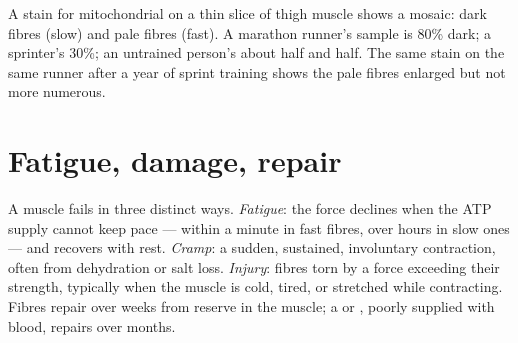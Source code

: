 \begin{example}\label{ex:g10:muscles-and-joints:biopsy}
A stain for mitochondrial  on a thin slice of thigh muscle
shows a mosaic: dark fibres (slow) and pale fibres (fast). A marathon
runner's sample is 80\% dark; a sprinter's 30\%; an untrained person's
about half and half. The same stain on the same runner after a year of
sprint training shows the pale fibres enlarged but not more numerous.
\end{example}

\section{Fatigue, damage, repair}

\begin{proposition}\label{prop:g10:muscles-and-joints:limits}
A muscle fails in three distinct ways. \emph{Fatigue}: the force
declines when the ATP supply cannot keep pace --- within a minute in
fast fibres, over hours in slow ones --- and recovers with rest.
\emph{Cramp}: a sudden, sustained, involuntary contraction, often from
dehydration or salt loss. \emph{Injury}: fibres torn by a force
exceeding their strength, typically when the muscle is cold, tired, or
stretched while contracting. Fibres repair over weeks from reserve
 in the muscle; a  or , poorly supplied with blood,
repairs over months.
\end{proposition}
\admitted

